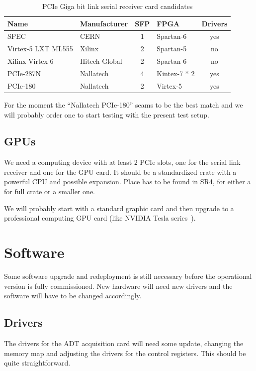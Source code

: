 \begin{table}[H]
\caption{PCIe Giga bit link serial receiver card candidates}
\label{tab:receiver_cards}
\centering
\begin{tabular}{|ll|c|l|c|}
\hline
Name & Manufacturer & SFP & FPGA & Drivers \\
\hline
\hline
SPEC & CERN & 1 & Spartan-6 & yes \\
\hline
Virtex-5 LXT ML555 & Xilinx & 2 & Spartan-5 & no \\
\hline
Xilinx Virtex 6 & Hitech Global & 2 & Spartan-6 & no \\
\hline		
PCIe-287N & Nallatech & 4 & Kintex-7 * 2 & yes \\		
PCIe-180 & Nallatech & 2 & Virtex-5 & yes \\
\hline
\end{tabular}
\end{table}

For the moment the ``Nallatech PCIe-180'' seams to be the best match and we will probably order one to start testing with the present test setup.

\subsection{GPUs}

We need a computing device with at least 2 PCIe slots, one for the serial link receiver and one for the \gls{GPU} card. It should be a standardized crate with a powerful \gls{CPU} and possible expansion. Place has to be found in SR4, for either a for full crate or a smaller one.

We will probably start with a standard graphic card and then upgrade to a professional computing \gls{GPU} card (like NVIDIA Tesla series~\cite{nvidia}).

\section{Software}

Some software upgrade and redeployment is still necessary before the operational version is fully commissioned. New hardware will need new drivers and the software will have to be changed accordingly.

\subsection{Drivers}

The drivers for the \gls{ADT} acquisition card will need some update, changing the memory map and adjusting the drivers for the control registers. This should be quite straightforward.

